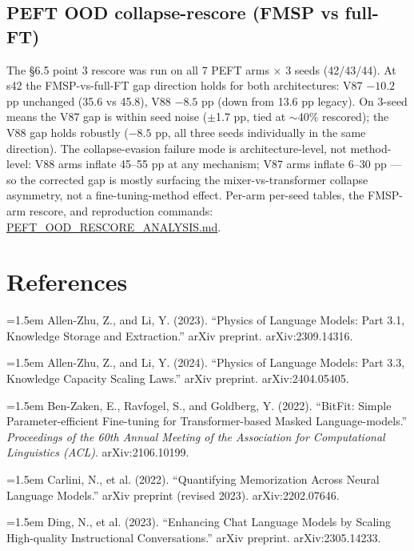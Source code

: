 \documentclass[11pt]{article}
\begin{document}
\subsection{PEFT OOD collapse-rescore (FMSP vs full-FT)}

The \S6.5 point 3 rescore was run on all 7 PEFT arms $\times$ 3 seeds (42/43/44). At s42 the FMSP-vs-full-FT gap direction holds for both architectures: V87 $-10.2$ pp unchanged (35.6 vs 45.8), V88 $-8.5$ pp (down from 13.6 pp legacy). On 3-seed means the V87 gap is within seed noise ($\pm$1.7 pp, tied at $\sim$40\% rescored); the V88 gap holds robustly ($-8.5$ pp, all three seeds individually in the same direction). The collapse-evasion failure mode is architecture-level, not method-level: V88 arms inflate 45--55 pp at any mechanism; V87 arms inflate 6--30 pp --- so the corrected gap is mostly surfacing the mixer-vs-transformer collapse asymmetry, not a fine-tuning-method effect. Per-arm per-seed tables, the FMSP-arm rescore, and reproduction commands: \href{https://github.com/llaa33219/MicroMixer-4/blob/4bb630413dfa58ef3141291e121ab8c006d03235/PEFT_OOD_RESCORE_ANALYSIS.md}{PEFT\_OOD\_RESCORE\_ANALYSIS.md}.

\section*{References}

\par\hangindent=1.5em Allen-Zhu, Z., and Li, Y. (2023). ``Physics of Language Models: Part 3.1, Knowledge Storage and Extraction.'' arXiv preprint. arXiv:2309.14316.

\par\hangindent=1.5em Allen-Zhu, Z., and Li, Y. (2024). ``Physics of Language Models: Part 3.3, Knowledge Capacity Scaling Laws.'' arXiv preprint. arXiv:2404.05405.

\par\hangindent=1.5em Ben-Zaken, E., Ravfogel, S., and Goldberg, Y. (2022). ``BitFit: Simple Parameter-efficient Fine-tuning for Transformer-based Masked Language-models.'' \emph{Proceedings of the 60th Annual Meeting of the Association for Computational Linguistics (ACL)}. arXiv:2106.10199.

\par\hangindent=1.5em Carlini, N., et al. (2022). ``Quantifying Memorization Across Neural Language Models.'' arXiv preprint (revised 2023). arXiv:2202.07646.

\par\hangindent=1.5em Ding, N., et al. (2023). ``Enhancing Chat Language Models by Scaling High-quality Instructional Conversations.'' arXiv preprint. arXiv:2305.14233.
\end{document}
